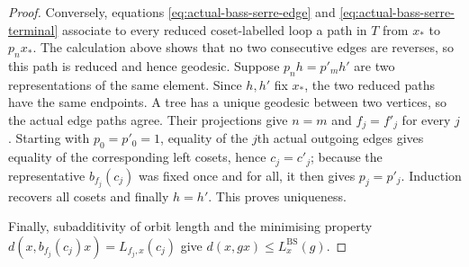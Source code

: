 \documentclass[10pt,a4paper]{amsart}
\newcommand{\BS}{\mathrm{BS}}
\begin{document}
\begin{proof}
Conversely, equations \eqref{eq:actual-bass-serre-edge} and
\eqref{eq:actual-bass-serre-terminal} associate to every reduced coset-labelled loop a path
in $T$ from $x_*$ to $p_nx_*$.  The calculation above shows that no two consecutive edges
are reverses, so this path is reduced and hence geodesic.  Suppose
$p_nh=p'_mh'$ are two representations of the same element.  Since $h,h'$ fix $x_*$, the two
reduced paths have the same endpoints.  A tree has a unique geodesic between two vertices,
so the actual edge paths agree.  Their projections give $n=m$ and
$f_j=f'_j$ for every $j$.  Starting with $p_0=p'_0=1$, equality of the $j$th actual outgoing
edges gives equality of the corresponding left cosets, hence $c_j=c'_j$; because the
representative $b_{f_j}(c_j)$ was fixed once and for all, it then gives $p_j=p'_j$.
Induction recovers all cosets and finally $h=h'$.  This proves uniqueness.

Finally, subadditivity of orbit length and the minimising property
$d(x,b_{f_j}(c_j)x)=L_{f_j,x}(c_j)$ give
$d(x,gx)\le L_x^{\BS}(g)$.
\end{proof}
\end{document}
